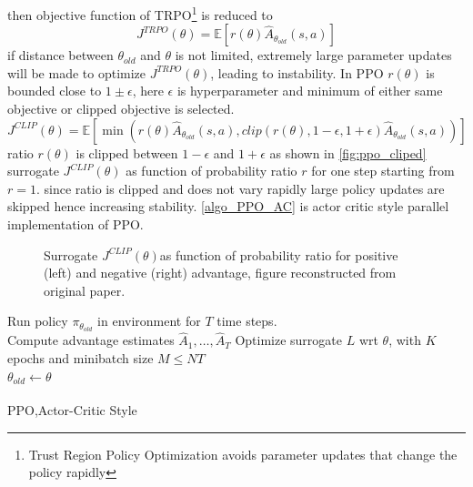 \noindent then objective function of TRPO\footnote{Trust Region Policy Optimization\cite{schulman2015trust} avoids parameter updates that change the policy rapidly} is reduced to
\begin{equation}
J^{TRPO} (\theta )=\mathbb{E}[ r(\theta )\hat{A}_{\theta _{old}} (s,a)]
\end{equation}
if distance between $\displaystyle \theta _{old}$ and $\displaystyle \theta $ is not limited, extremely large parameter updates will be made to optimize $\displaystyle J^{TRPO}( \theta )$, leading to instability. In PPO $\displaystyle r( \theta )$ is bounded close to $\displaystyle 1\pm \epsilon $, here $\displaystyle \epsilon $ is hyperparameter and minimum of either same objective or clipped objective is selected.
\begin{equation}
J^{CLIP} (\theta )=\mathbb{E} [\min (r(\theta )\hat{A}_{\theta _{old}} (s,a),clip(r(\theta ),1-\epsilon ,1+\epsilon )\hat{A}_{\theta _{old}} (s,a))]
\end{equation}
ratio $\displaystyle r( \theta )$ is clipped between $\displaystyle 1-\epsilon $ and $\displaystyle 1+\epsilon $ as shown in \autoref{fig:ppo_cliped} surrogate $J^{CLIP}(\theta)$ as function of probability ratio $r$ for one step starting from $r=1$. since ratio is clipped and does not vary rapidly large policy updates are skipped hence increasing stability. \autoref{algo_PPO_AC} is actor critic style parallel implementation of PPO.

\begin{figure}[H]
    \centering
        \caption{Surrogate $J^{CLIP}(\theta)$as function of probability ratio for positive (left) and negative (right) advantage, figure reconstructed from original paper. \cite{schulman2017proximal}}
    \label{fig:ppo_cliped}
\end{figure}


\begin{algorithm}[H]
\SetAlgoLined
{}
 {
 {
Run policy $\displaystyle \pi_{\theta_{old}}$ in environment for $T$ time steps.\\
Compute advantage estimates $\hat{A}_1,\dots,\hat{A}_T$
}
Optimize surrogate $L$ wrt $\theta$, with $K$ epochs and minibatch size $M \leq NT$ \\
$\theta_{old} \xleftarrow[]{} \theta$
}
 \caption{PPO,Actor-Critic Style}
    \label{algo_PPO_AC}
\end{algorithm}
